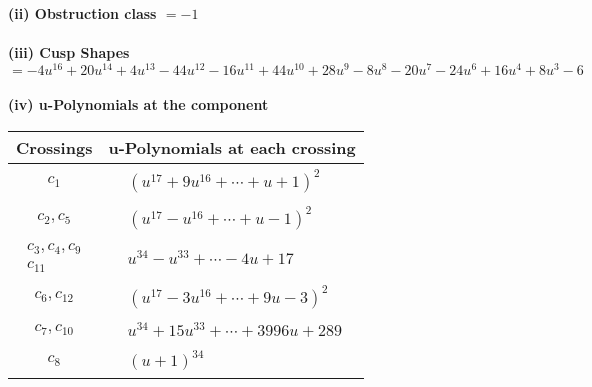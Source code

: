 \documentclass[1p]{elsarticle_modified}
\theoremstyle{definition}
\begin{document}
\flushleft \textbf{(ii) Obstruction class $= -1$}\\~\\
\flushleft \textbf{(iii) Cusp Shapes $= -4 u^{16}+20 u^{14}+4 u^{13}-44 u^{12}-16 u^{11}+44 u^{10}+28 u^9-8 u^8-20 u^7-24 u^6+16 u^4+8 u^3-6$}\\~\\
\newpage\renewcommand{\arraystretch}{1}
\flushleft \textbf{(iv) u-Polynomials at the component}\newline \\
\begin{tabular}{m{50pt}|m{274pt}}
Crossings & \hspace{64pt}u-Polynomials at each crossing \\
\hline $$\begin{aligned}c_{1}\end{aligned}$$&$\begin{aligned}
&(u^{17}+9 u^{16}+\cdots+u+1)^{2}
\end{aligned}$\\
\hline $$\begin{aligned}c_{2},c_{5}\end{aligned}$$&$\begin{aligned}
&(u^{17}- u^{16}+\cdots+u-1)^{2}
\end{aligned}$\\
\hline $$\begin{aligned}c_{3},c_{4},c_{9}\\c_{11}\end{aligned}$$&$\begin{aligned}
&u^{34}- u^{33}+\cdots-4 u+17
\end{aligned}$\\
\hline $$\begin{aligned}c_{6},c_{12}\end{aligned}$$&$\begin{aligned}
&(u^{17}-3 u^{16}+\cdots+9 u-3)^{2}
\end{aligned}$\\
\hline $$\begin{aligned}c_{7},c_{10}\end{aligned}$$&$\begin{aligned}
&u^{34}+15 u^{33}+\cdots+3996 u+289
\end{aligned}$\\
\hline $$\begin{aligned}c_{8}\end{aligned}$$&$\begin{aligned}
&(u+1)^{34}
\end{aligned}$\\
\hline
\end{tabular}\\~\\
\end{document}

